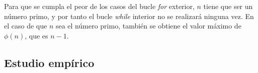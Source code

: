 \documentclass{uc3mpracticas}
\begin{document}
  \vspace{2mm}

  Para que se cumpla el peor de los casos del bucle \textit{for} exterior, $n$ tiene que ser un número primo, y por tanto el bucle \textit{while} interior no se realizará ninguna vez. En el caso de que $n$ sea el número primo, también se obtiene el valor máximo de $\phi(n)$, que es $n-1$.



  \subsection{Estudio empírico}



%
% 
% 
\end{document}

